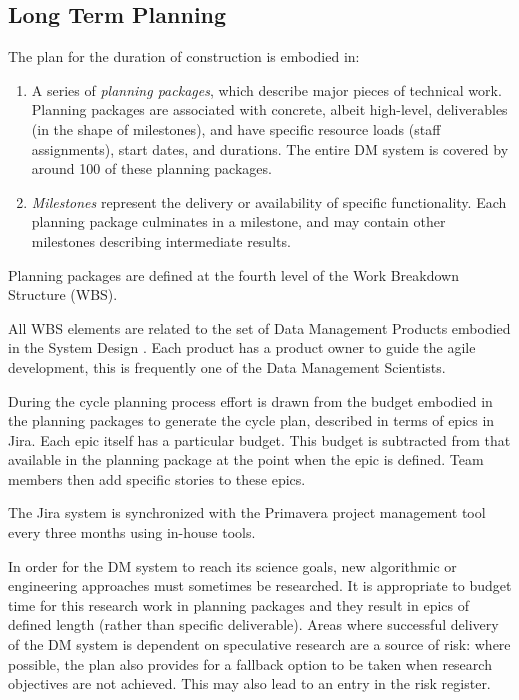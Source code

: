 \subsection{Long Term Planning}
\label{sec:long-term-plan}

The plan for the duration of construction is embodied in:

\begin{enumerate}
\item
  A series of \emph{planning packages}, which describe major pieces of
  technical work. Planning packages are associated with concrete, albeit
  high-level, deliverables (in the shape of milestones), and have
  specific resource loads (staff assignments), start dates, and
  durations. The entire DM system is covered by around 100 of these
  planning packages.
\item
  \emph{Milestones} represent the delivery or availability of specific
  functionality. Each planning package culminates in a milestone, and
  may contain other milestones describing intermediate results.
\end{enumerate}

Planning packages are defined at the fourth level of the Work Breakdown Structure (WBS).

All WBS elements are related to the set of Data Management Products embodied in the System Design \cite{LDM-148}.
Each product has a product owner to guide the agile development, this is frequently one of the Data Management Scientists.

During the cycle planning process  effort is drawn from the budget embodied in the planning packages to generate the cycle plan, described in terms of epics in Jira.
Each epic itself has a particular budget.
This budget is subtracted from that available in the planning package at the point when the epic is defined.
Team members then add specific stories to these epics.

The Jira system is synchronized with the Primavera project management tool every three months using in-house tools.

In order for the DM system to reach its science goals, new algorithmic or engineering approaches must sometimes be researched.
It is appropriate to budget time for this research work in planning packages and they result in epics of defined length (rather than specific  deliverable).
Areas where successful delivery of the DM system is dependent on speculative research are a source of risk: where possible, the plan  also provides for a fallback option to be taken when research objectives are not achieved.
This may also lead to an entry in the risk register.


